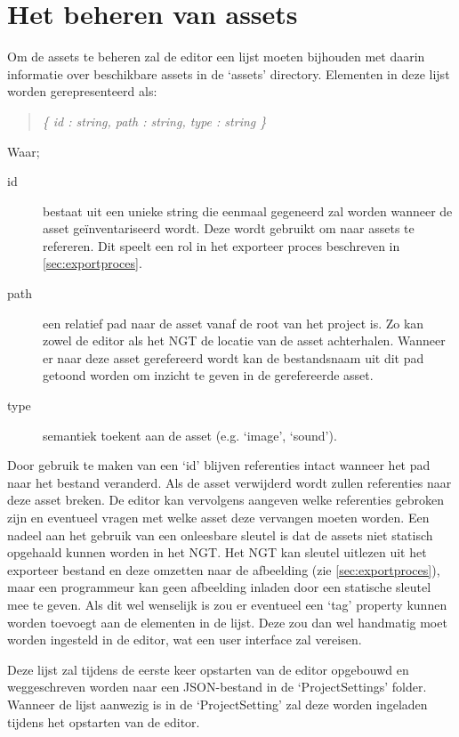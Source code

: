 \section{Het beheren van assets}
\label{sec:assetmanagement}
Om de assets te beheren zal de editor een lijst moeten bijhouden met daarin informatie over beschikbare assets in de ‘assets’ directory. Elementen in deze lijst worden gerepresenteerd als:
\begin{quote} 
    \centering    
    \textit{
        \{ id : string, path : string, type : string \} 
    }
\end{quote}
\noindent Waar;
\begin{description}
    \item[id] bestaat uit een unieke string die eenmaal gegeneerd zal worden wanneer de asset geïnventariseerd wordt. Deze wordt gebruikt om naar assets te refereren. Dit speelt een rol in het exporteer proces beschreven in \autoref{sec:exportproces}.
    \item[path] een relatief pad naar de asset vanaf de root van het project is. Zo kan zowel de editor als het NGT de locatie van de asset achterhalen. Wanneer er naar deze asset gerefereerd wordt kan de bestandsnaam uit dit pad getoond worden om inzicht te geven in de gerefereerde asset.
    \item[type] semantiek toekent aan de asset (e.g. ‘image’, ‘sound’).
\end{description}

Door gebruik te maken van een ‘id’ blijven referenties intact wanneer het pad naar het bestand veranderd. Als de asset verwijderd wordt zullen referenties naar deze asset breken. De editor kan vervolgens aangeven welke referenties gebroken zijn en eventueel vragen met welke asset deze vervangen moeten worden. Een nadeel aan het gebruik van een onleesbare sleutel is dat de assets niet statisch opgehaald kunnen worden in het NGT. Het NGT kan sleutel uitlezen uit het exporteer bestand en deze omzetten naar de afbeelding (zie \autoref{sec:exportproces}), maar een programmeur kan geen afbeelding inladen door een statische sleutel mee te geven. Als dit wel wenselijk is zou er eventueel een ‘tag’ property kunnen worden toevoegt aan de elementen in de lijst. Deze zou dan wel handmatig moet worden ingesteld in de editor, wat een user interface zal vereisen.

Deze lijst zal tijdens de eerste keer opstarten van de editor opgebouwd en weggeschreven worden naar een JSON-bestand in de ‘ProjectSettings’ folder. Wanneer de lijst aanwezig is in de ‘ProjectSetting’ zal deze worden ingeladen tijdens het opstarten van de editor.

